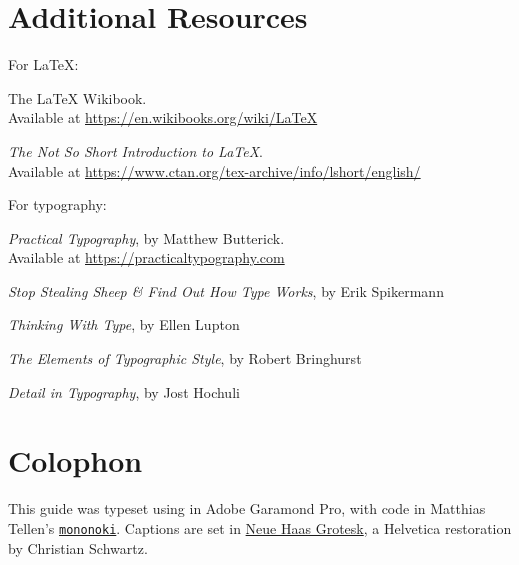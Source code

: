\chapter{Additional Resources}

For \LaTeX:

\begin{adjustwidth}{1.5em}{0pt}
The \LaTeX{} Wikibook. \\
Available at \url{https://en.wikibooks.org/wiki/LaTeX}

\textit{The Not So Short Introduction to \LaTeX}. \\
Available at \url{https://www.ctan.org/tex-archive/info/lshort/english/}
\end{adjustwidth}
\vspace{0.3in}

For typography:

\begin{adjustwidth}{1.5em}{0pt}
\textit{Practical Typography}, by Matthew Butterick. \\
Available at \url{https://practicaltypography.com}

\textit{Stop Stealing Sheep \& Find Out How Type Works}, by Erik Spikermann

\textit{Thinking With Type}, by Ellen Lupton

\textit{The Elements of Typographic Style}, by Robert Bringhurst

\textit{Detail in Typography}, by Jost Hochuli
\end{adjustwidth}

{\raggedright
\renewcommand\makeenmark{\theenmark.\enspace}
\theendnotes
}

\chapter{Colophon}

This guide was typeset using \LuaLaTeX{}
in Adobe Garamond Pro,
with code in Matthias Tellen's
\href{https://madmalik.github.io/mononoki/}{\texttt{mononoki}}.
Captions are set in
\href{http://www.fontbureau.com/NHG/}{\textsf{\small Neue Haas Grotesk}},
a Helvetica restoration by Christian Schwartz.


